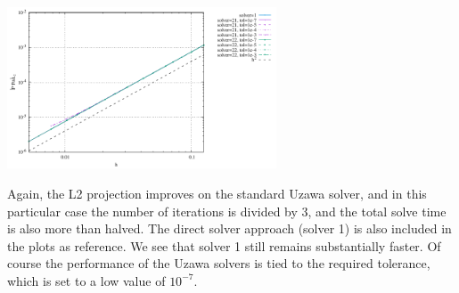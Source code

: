 \begin{center}
\includegraphics[width=8cm]{python_codes/fieldstone_147/RESULTS/L2/uzawa3/errorsP.pdf}
\end{center}

Again, the L2 projection improves on the standard Uzawa solver, and in 
this particular case the number of iterations is divided by 3, and the total solve 
time is also more than halved.
The direct solver approach (solver 1) is also included in the plots as reference. 
We see that solver 1 still remains substantially faster.
Of course the performance of the Uzawa solvers is tied to the required tolerance,
which is set to a low value of $10^{-7}$.


